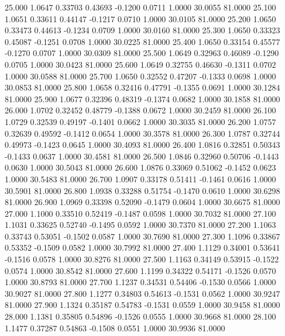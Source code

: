   25.000   1.0647   0.33703   0.43693  -0.1200   0.0711   1.0000  30.0055  81.0000
  25.100   1.0651   0.33611   0.44147  -0.1217   0.0710   1.0000  30.0105  81.0000
  25.200   1.0650   0.33473   0.44613  -0.1234   0.0709   1.0000  30.0160  81.0000
  25.300   1.0650   0.33323   0.45087  -0.1251   0.0708   1.0000  30.0225  81.0000
  25.400   1.0650   0.33154   0.45577  -0.1270   0.0707   1.0000  30.0309  81.0000
  25.500   1.0649   0.32963   0.46089  -0.1290   0.0705   1.0000  30.0423  81.0000
  25.600   1.0649   0.32755   0.46630  -0.1311   0.0702   1.0000  30.0588  81.0000
  25.700   1.0650   0.32552   0.47207  -0.1333   0.0698   1.0000  30.0853  81.0000
  25.800   1.0658   0.32416   0.47791  -0.1355   0.0691   1.0000  30.1284  81.0000
  25.900   1.0677   0.32396   0.48319  -0.1374   0.0682   1.0000  30.1858  81.0000
  26.000   1.0702   0.32452   0.48779  -0.1388   0.0672   1.0000  30.2459  81.0000
  26.100   1.0729   0.32539   0.49197  -0.1401   0.0662   1.0000  30.3035  81.0000
  26.200   1.0757   0.32639   0.49592  -0.1412   0.0654   1.0000  30.3578  81.0000
  26.300   1.0787   0.32744   0.49973  -0.1423   0.0645   1.0000  30.4093  81.0000
  26.400   1.0816   0.32851   0.50343  -0.1433   0.0637   1.0000  30.4581  81.0000
  26.500   1.0846   0.32960   0.50706  -0.1443   0.0630   1.0000  30.5043  81.0000
  26.600   1.0876   0.33069   0.51062  -0.1452   0.0623   1.0000  30.5483  81.0000
  26.700   1.0907   0.33178   0.51411  -0.1461   0.0616   1.0000  30.5901  81.0000
  26.800   1.0938   0.33288   0.51754  -0.1470   0.0610   1.0000  30.6298  81.0000
  26.900   1.0969   0.33398   0.52090  -0.1479   0.0604   1.0000  30.6675  81.0000
  27.000   1.1000   0.33510   0.52419  -0.1487   0.0598   1.0000  30.7032  81.0000
  27.100   1.1031   0.33625   0.52740  -0.1495   0.0592   1.0000  30.7370  81.0000
  27.200   1.1063   0.33743   0.53051  -0.1502   0.0587   1.0000  30.7690  81.0000
  27.300   1.1096   0.33867   0.53352  -0.1509   0.0582   1.0000  30.7992  81.0000
  27.400   1.1129   0.34001   0.53641  -0.1516   0.0578   1.0000  30.8276  81.0000
  27.500   1.1163   0.34149   0.53915  -0.1522   0.0574   1.0000  30.8542  81.0000
  27.600   1.1199   0.34322   0.54171  -0.1526   0.0570   1.0000  30.8793  81.0000
  27.700   1.1237   0.34531   0.54406  -0.1530   0.0566   1.0000  30.9027  81.0000
  27.800   1.1277   0.34803   0.54613  -0.1531   0.0562   1.0000  30.9247  81.0000
  27.900   1.1324   0.35187   0.54783  -0.1531   0.0559   1.0000  30.9458  81.0000
  28.000   1.1381   0.35805   0.54896  -0.1526   0.0555   1.0000  30.9668  81.0000
  28.100   1.1477   0.37287   0.54863  -0.1508   0.0551   1.0000  30.9936  81.0000
